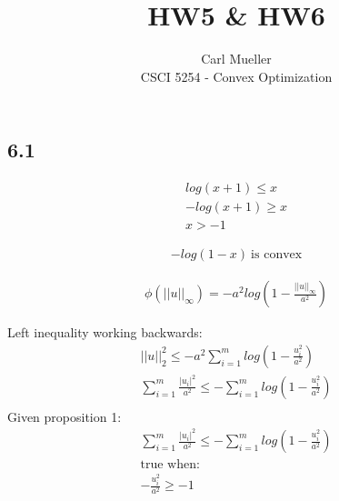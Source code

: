 \documentclass[12pt]{article}
\newenvironment{proposition}[2][Proposition]{\begin{trivlist}
\item[\hskip \labelsep {\bfseries #1}\hskip \labelsep {\bfseries #2.}]}{\end{trivlist}}
\begin{document}
 
 
 
\title{HW5 & HW6}
\author{Carl Mueller\\ %
CSCI 5254 - Convex Optimization} %
\maketitle

\subsection*{6.1}
\begin{proposition}{1}
\begin{align}
log(x+1) \le x\\ -log(x+1) \ge x\\ x > -1
\end{align}
\end{proposition}

\begin{proposition}{2}
\begin{align}
-log(1-x)\ \text{is convex}
\end{align}
\end{proposition}
\begin{proposition}{3}
\begin{align}
\phi(||u||_{\infty}) = -a^2log(1-\frac{||u||_{\infty}}{a^2})
\end{align}
\end{proposition}

Left inequality working backwards:
\begin{equation*}
\begin{aligned}
||u||_{2}^{2} \le -a^2\sum_{i=1}^{m}log(1 - \frac{u_{i}^{2}}{a^2})\\
\sum_{i=1}^{m}\frac{|u_i|^2}{a^2} \le -\sum_{i=1}^{m}log(1 - \frac{u_{i}^{2}}{a^2})\\
\end{aligned}
\end{equation*}
Given proposition 1:
\begin{equation*}
\begin{aligned}
\sum_{i=1}^{m}\frac{|u_i|^2}{a^2} \le -\sum_{i=1}^{m}log(1 - \frac{u_{i}^{2}}{a^2})\\
\text{true when: }\\
- \frac{u_{i}^{2}}{a^2} \ge -1
\end{aligned}
\end{equation*}
\end{document}
